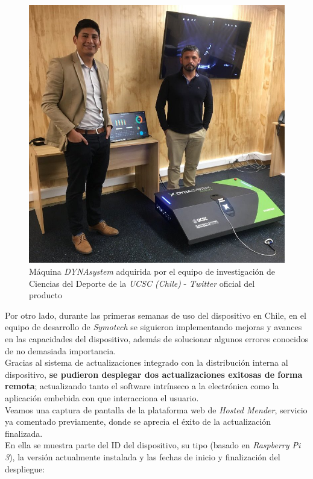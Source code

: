 \begin{figure}[H]
	\centering
	\includegraphics[width=0.7\linewidth]{imagenes/dynasystem-ucsc-2.jpg}
	\caption{Máquina \textit{DYNAsystem} adquirida por el equipo de investigación de Ciencias del Deporte de la \textit{UCSC (Chile)} - \textit{Twitter} oficial del producto \cite{dynasystem-ucsc-2}}
	\label{dynasystem-ucsc-2}
\end{figure}

Por otro lado, durante las primeras semanas de uso del dispositivo en Chile, en el equipo de desarrollo de \textit{Symotech} se siguieron implementando mejoras y avances en las capacidades del dispositivo, además de solucionar algunos errores conocidos de no demasiada importancia.\\

Gracias al sistema de actualizaciones integrado con la distribución interna al dispositivo, \textbf{se pudieron desplegar dos actualizaciones exitosas de forma remota}; actualizando tanto el software intrínseco a la electrónica como la aplicación embebida con que interacciona el usuario.\\

Veamos una captura de pantalla de la plataforma web de \textit{Hosted Mender}, servicio ya comentado previamente, donde se aprecia el éxito de la actualización finalizada.\\

En ella se muestra parte del ID del dispositivo, su tipo (basado en \textit{Raspberry Pi 3}), la versión actualmente instalada y las fechas de inicio y finalización del despliegue:

